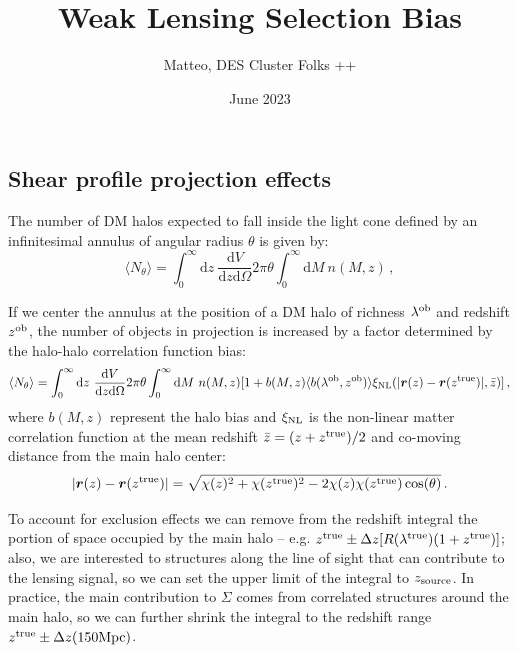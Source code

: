 \documentclass{article}
\title{Weak Lensing Selection Bias}
\author{Matteo, DES Cluster Folks ++ }
\date{June 2023}
\newcommand{\de}{\text{d}}
\newcommand{\0}{\textup{0}}
\newcommand{\ob}{^{\rm ob}}
\newcommand{\true}{^{\rm true}}
\begin{document}
\maketitle

\subsection{Shear profile projection effects}
The number of DM halos expected to fall inside the light cone defined by an infinitesimal annulus of angular radius $\theta$ is given by:
%
\begin{equation}
 \langle N _{\theta}  \rangle =  \int_0^{\infty} \de z\ \frac{\de V}{\de z \de \Omega}
 2 \pi \theta \int_0^{\infty} \de M\ n(M,z)\, ,
\end{equation}
%

If we center the annulus at the position of a DM halo of richness $\lambda\ob$ and redshift $z\ob$, the number of objects in projection is increased by a factor determined by the halo-halo correlation function bias:
%
\begin{equation}
 \langle N _{\theta}  \rangle =  \int_0^{\infty} \de z\ \frac{\de V}{\de z \de \Omega}
 2 \pi \theta \int_0^{\infty} \de M\ n(M,z) [1 + b(M,z) \langle b (\lambda\ob, z\ob) \rangle \xi_{\rm NL}(|\bm{r}(z)-\bm{r}(z\true)|,\bar{z})]\, ,
\end{equation}
%
where $b(M,z)$ represent the halo bias and $\xi_{\rm NL}$ is the non-linear matter correlation function at the mean redshift $\bar{z}=(z+z\true)/2$ and co-moving distance from the main halo center:
\begin{equation}
    |\bm{r}(z)-\bm{r}(z\true)| = \sqrt{\chi(z)^2+\chi(z\true)^2 - 2\chi(z)\chi(z\true)\cos (\theta) } \, .
\end{equation}

To account for exclusion effects we can remove from the redshift integral the portion of space occupied by the main halo -- e.g. $z\true \pm \Delta z[R(\lambda\true)(1+z\true)]$; also, we are interested to structures along the line of sight that can contribute to the lensing signal, so we can set the upper limit of the integral to $z_{\rm source}$. In practice, the main contribution to $\Sigma$ comes from correlated structures around the main halo, so we can further shrink the integral to the redshift range $z\true \pm \Delta z(150 {\rm Mpc})$.

\end{document}

